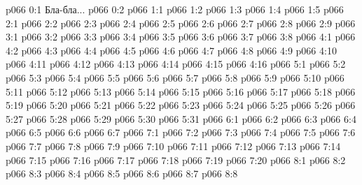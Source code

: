 \author{Мелхиседек}
\vs p066 0:1  Бла-бла...
\vs p066 0:2 
\vs p066 1:1 
\vs p066 1:2 
\vs p066 1:3 \pc 
\vs p066 1:4 
\vs p066 1:5 
\vs p066 2:1 
\vs p066 2:2 
\vs p066 2:3 
\vs p066 2:4 \pc 
\vs p066 2:5 
\vs p066 2:6 \pc 
\vs p066 2:7 
\vs p066 2:8 \pc 
\vs p066 2:9 
\vs p066 3:1 
\vs p066 3:2 
\vs p066 3:3 \pc 
\vs p066 3:4 
\vs p066 3:5 
\vs p066 3:6 
\vs p066 3:7 \pc 
\vs p066 3:8 
\vs p066 4:1 
\vs p066 4:2 
\vs p066 4:3 
\vs p066 4:4 
\vs p066 4:5 
\vs p066 4:6 
\vs p066 4:7 
\vs p066 4:8 
\vs p066 4:9 
\vs p066 4:10 
\vs p066 4:11 
\vs p066 4:12 
\vs p066 4:13 
\vs p066 4:14 
\vs p066 4:15 \pc 
\vs p066 4:16 
\vs p066 5:1 
\vs p066 5:2 
\vs p066 5:3 
\vs p066 5:4 
\vs p066 5:5 
\vs p066 5:6 
\vs p066 5:7 
\vs p066 5:8 
\vs p066 5:9 
\vs p066 5:10 
\vs p066 5:11 
\vs p066 5:12 
\vs p066 5:13 
\vs p066 5:14 
\vs p066 5:15 \pc 
\vs p066 5:16 \pc 
\vs p066 5:17 
\vs p066 5:18 
\vs p066 5:19 
\vs p066 5:20 
\vs p066 5:21 
\vs p066 5:22 
\vs p066 5:23 
\vs p066 5:24 
\vs p066 5:25 
\vs p066 5:26 
\vs p066 5:27 
\vs p066 5:28 
\vs p066 5:29 
\vs p066 5:30 
\vs p066 5:31 
\vs p066 6:1 
\vs p066 6:2 
\vs p066 6:3 
\vs p066 6:4 
\vs p066 6:5 
\vs p066 6:6 
\vs p066 6:7 
\vs p066 7:1 
\vs p066 7:2 
\vs p066 7:3 
\vs p066 7:4 \pc 
\vs p066 7:5 
\vs p066 7:6 \pc 
\vs p066 7:7 
\vs p066 7:8 \pc 
\vs p066 7:9 
\vs p066 7:10 
\vs p066 7:11 
\vs p066 7:12 
\vs p066 7:13 
\vs p066 7:14 
\vs p066 7:15 
\vs p066 7:16 \pc 
\vs p066 7:17 \pc 
\vs p066 7:18 \pc 
\vs p066 7:19 
\vs p066 7:20 
\vs p066 8:1 
\vs p066 8:2 
\vs p066 8:3 \pc 
\vs p066 8:4 
\vs p066 8:5 
\vs p066 8:6 \pc 
\vs p066 8:7 
\vsetoff
\vs p066 8:8 
\quizlink
